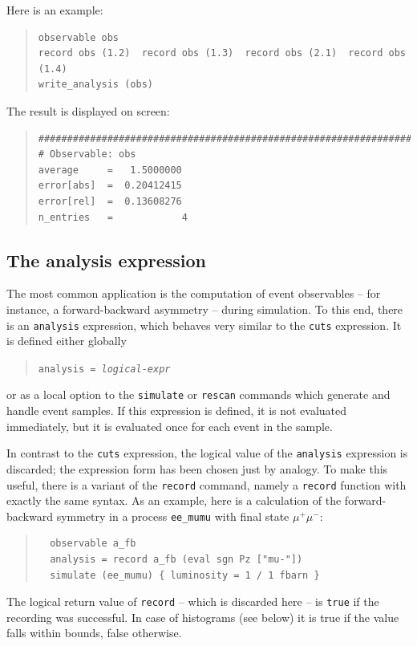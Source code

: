 \documentclass[12pt]{book}
\newcommand{\ttt}[1]{\texttt{#1}}
\begin{document}
Here is an example:
\begin{quote}
  \begin{footnotesize}
\begin{verbatim}
observable obs
record obs (1.2)  record obs (1.3)  record obs (2.1)  record obs (1.4)
write_analysis (obs)
\end{verbatim}
  \end{footnotesize}
\end{quote}
The result is displayed on screen:
\begin{quote}
  \begin{footnotesize}
\begin{verbatim}
###############################################################################
# Observable: obs
average     =   1.5000000
error[abs]  =  0.20412415
error[rel]  =  0.13608276
n_entries   =            4
\end{verbatim}
  \end{footnotesize}
\end{quote}


\subsection{The analysis expression}
\label{subsec:analysis}

The most common application is the computation of event observables -- for
instance, a forward-backward asymmetry -- during simulation.  To this end,
there is an \ttt{analysis} expression, which behaves very similar to the
\ttt{cuts} expression.  It is defined either globally
\begin{quote}
  \begin{footnotesize}
    \ttt{analysis = \emph{logical-expr}}
  \end{footnotesize}
\end{quote}
or as a local option to the \ttt{simulate} or \ttt{rescan} commands which
generate and handle event samples.  If this expression is defined, it is not
evaluated immediately, but it is evaluated once for each event in the sample.

In contrast to the \ttt{cuts} expression, the logical value of the
\ttt{analysis} expression is discarded; the expression form has been chosen
just by analogy.  To make this useful, there is a variant of the \ttt{record}
command, namely a \ttt{record} function with exactly the same syntax.  As an
example, here is a calculation of the forward-backward symmetry in a process
\ttt{ee\_mumu} with final state $\mu^+\mu^-$:
\begin{quote}
  \begin{footnotesize}
\begin{verbatim}
  observable a_fb
  analysis = record a_fb (eval sgn Pz ["mu-"])
  simulate (ee_mumu) { luminosity = 1 / 1 fbarn }
\end{verbatim}
  \end{footnotesize}
\end{quote}
The logical return value of \ttt{record} -- which is discarded here -- is
\ttt{true} if the recording was successful.  In case of histograms (see below)
it is true if the value falls within bounds, false otherwise.
\end{document}
